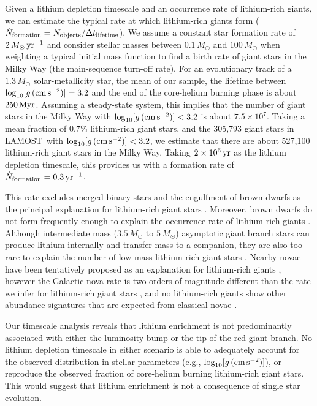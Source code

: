 \documentclass[twocolumn]{aastex62}
\newcommand\lamost{LAMOST}
\newcommand{\logg}{\log_{10}[g\,({\rm cm\,s}^{-2})]}
\begin{document}
Given a lithium depletion timescale and an occurrence rate of lithium-rich giants,
we can estimate the typical rate at which lithium-rich giants form 
($\dot N_{\rm{formation}} = N_{\rm{objects}}/\Delta t_{\rm{lifetime}}$). 
We assume a constant star formation rate of $2\,M_\odot\,{\rm yr}^{-1}$ and
consider stellar masses between $0.1\,M_\odot$ and $100\,M_\odot$ when weighting
a typical initial mass function \citep{Kroupa_2001} to find a birth rate of giant stars in the Milky Way (the main-sequence turn-off rate).
For an evolutionary track \citep{Dotter_2016,Choi_2016} of a $1.3\,M_\odot$ 
solar-metallicity star, the mean of our sample, the lifetime between $\logg = 3.2$
and the end of the core-helium burning phase is about $250\,{\rm Myr}$. 
Assuming a steady-state system, this implies that the number of giant stars in the Milky Way with 
$\logg < 3.2$ is about $7.5\times10^7$. Taking a mean fraction of 0.7\% 
lithium-rich giant stars, and the 305,793 giant stars in \lamost\ with 
$\logg < 3.2$, we estimate that there are about 527,100 lithium-rich 
giant stars in the Milky Way.  Taking $2\times10^{6}\,{\rm yr}$ as the 
lithium depletion timescale, this provides us with a formation rate of 
$\dot N_{\rm formation} = 0.3\,{\rm yr}^{-1}$. 


This rate excludes merged binary stars \citep[$0.01\,{\rm yr}^{-1}$;][]{Andrievsky_1999}
and the engulfment of brown dwarfs \citep{Siess_1999} as the principal explanation
for lithium-rich giant stars \citep{Politano_2010,Ivanova_2013}. 
Moreover, brown dwarfs do not form frequently enough to explain the occurrence rate of 
lithium-rich giants \citep{Cumming_2008}. Although intermediate mass 
($3.5\,M_\odot$ to $5\,M_\odot$) asymptotic giant branch stars can produce lithium
internally and transfer mass to a companion, they are also too rare to explain the number
of low-mass lithium-rich giant stars \citep{Karakas_2016}.
Nearby novae have been tentatively proposed as an explanation for lithium-rich giants \citep{Gratton_1989},  however the Galactic nova rate is two orders of magnitude different than the rate we infer for lithium-rich giant 
stars \citep[$50\,{\rm yr}^{-1}$;][]{Shafter_2017}, and no lithium-rich giants show other abundance signatures that are expected from classical novae \citep{Melo_2005}.



Our timescale analysis reveals that lithium enrichment is not predominantly 
associated with either the luminosity bump or the tip of the red giant branch.
No lithium depletion timescale in either scenario is able to adequately account
for the observed distribution in stellar parameters (e.g., $\logg$), or reproduce
the observed fraction of core-helium burning lithium-rich giant stars. This would
suggest that lithium enrichment is not a consequence of single star evolution.
\end{document}
